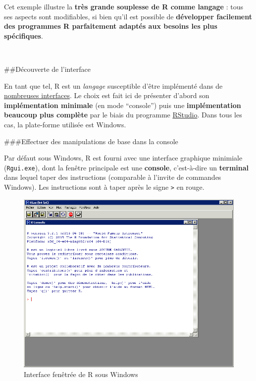 \documentclass[12pt,twosided, notitlepage]{book}
\begin{document}
Cet exemple illustre la \textbf{très grande souplesse de R comme
langage} : tous ses aspects sont modifiables, si bien qu'il est possible
de \textbf{développer facilement des programmes R parfaitement adaptés
aux besoins les plus spécifiques}.

~

\#\#Découverte de l'interface

En tant que tel, R est un \emph{langage} susceptible d'être implémenté
dans de
\href{https://fr.wikipedia.org/wiki/R_(langage)\#Interfaces}{nombreuses
interfaces}. Le choix est fait ici de présenter d'abord son
\textbf{implémentation minimale} (en mode \enquote{console}) puis une
\textbf{implémentation beaucoup plus complète} par le biais du programme
\href{https://www.rstudio.com/}{RStudio}. Dans tous les cas, la
plate-forme utilisée est Windows.

\#\#\#Effectuer des manipulations de base dans la console

Par défaut sous Windows, R est fourni avec une interface graphique
minimiale (\texttt{Rgui.exe}), dont la fenêtre principale est une
\textbf{console}, c'est-à-dire un \textbf{terminal} dans lequel taper
des instructions (comparable à l'invite de commandes Windows). Les
instructions sont à taper après le signe \texttt{\textgreater{}} en
rouge.

\begin{figure}
\centering
\includegraphics{../figures/Interface_R.png}
\caption{Interface fenêtrée de R sous Windows}
\end{figure}
\end{document}

